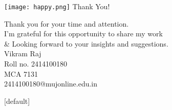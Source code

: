 \documentclass{beamer}
\begin{document}
\begin{frame}[plain]
    \centering
    \vfill
    \texttt{[image: happy.png]}
    \vspace{0.2cm}
    {\huge \textcolor{themepurple}{Thank You!}}\par
    \vspace{0.2cm}
    {\small \textcolor{themecyan}{Thank you for your time and attention.\\
    I'm grateful for this opportunity to share my work\\
    \& Looking forward to your insights and suggestions.\\}}
    \vspace{0.2cm}
    {\large \textcolor{themegold}{Vikram Raj\\ Roll no. 2414100180\\MCA 7131\\2414100180@mujonline.edu.in}}\\
    \vspace{0.3cm}
    \begin{center}
    \end{center}
    \vfill
\end{frame}
[default]
\end{document}
